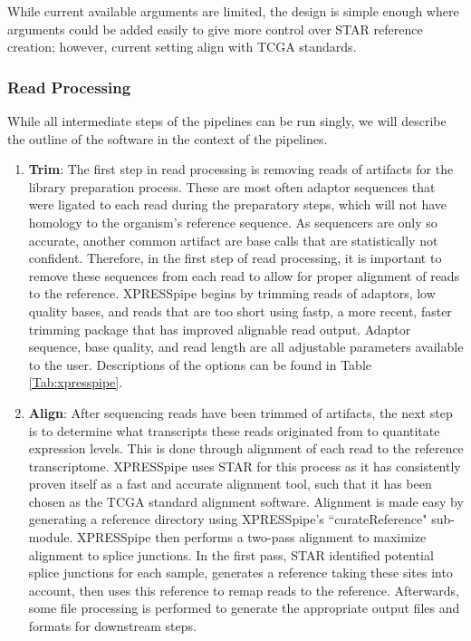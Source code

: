 \documentclass[11pt, a4paper, oneside]{article}
\begin{document}
While current available arguments are limited, the design is simple enough where arguments could be added easily to give more control over STAR reference creation; however, current setting align with TCGA standards.

\subsubsection{Read Processing}
While all intermediate steps of the pipelines can be run singly, we will describe the outline of the software in the context of the pipelines.

\begin{enumerate}
  \item \textbf{Trim}: The first step in read processing is removing reads of artifacts for the library preparation process. These are most often adaptor sequences that were ligated to each read during the preparatory steps, which will not have homology to the organism's reference sequence. As sequencers are only so accurate, another common artifact are base calls that are statistically not confident. Therefore, in the first step of read processing, it is important to remove these sequences from each read to allow for proper alignment of reads to the reference. XPRESSpipe begins by trimming reads of adaptors, low quality bases, and reads that are too short using fastp, a more recent, faster trimming package that has improved alignable read output{}. Adaptor sequence, base quality, and read length are all adjustable parameters available to the user. Descriptions of the options can be found in Table \ref{Tab:xpresspipe}.
  \item \textbf{Align}: After sequencing reads have been trimmed of artifacts, the next step is to determine what transcripts these reads originated from to quantitate expression levels. This is done through alignment of each read to the reference transcriptome. XPRESSpipe uses STAR{} for this process as it has consistently proven itself as a fast and accurate alignment tool{}, such that it has been chosen as the TCGA standard alignment software. Alignment is made easy by generating a reference directory using XPRESSpipe's ``curateReference" sub-module. XPRESSpipe then performs a two-pass alignment to maximize alignment to splice junctions. In the first pass, STAR identified potential splice junctions for each sample, generates a reference taking these sites into account, then uses this reference to remap reads to the reference. Afterwards, some file processing is performed to generate the appropriate output files and formats for downstream steps.

\end{enumerate}
\end{document}
